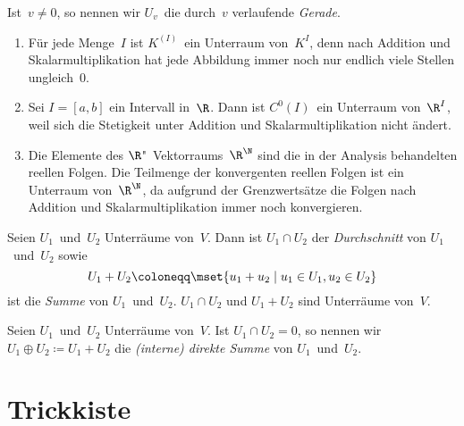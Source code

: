 \documentclass[a4paper]{article}
\begin{document}
\begin{notation}[Gerade]
    Ist~$v \neq 0$, so nennen wir $U_v$~die durch~$v$ verlaufende \emph{Gerade}.
\end{notation}

\begin{example}\leavevmode
    \begin{enumerate}
        \item Für jede Menge~$I$ ist $K^{(I)}$~ein Unterraum von~$K^I$, denn nach Addition und Skalarmultiplikation hat jede Abbildung immer noch nur endlich viele Stellen ungleich~0.
        \item Sei $I = [a,b]$ ein Intervall in~$\R$. Dann ist $C^0(I)$~ein Unterraum von~$\R^I$, weil sich die Stetigkeit unter Addition und Skalarmultiplikation nicht ändert.
        \item Die Elemente des $\R$"~Vektorraums~$\R^\N$ sind die in der Analysis behandelten reellen Folgen. Die Teilmenge der konvergenten reellen Folgen ist ein Unterraum von~$\R^\N$, da aufgrund der Grenzwertsätze die Folgen nach Addition und Skalarmultiplikation immer noch konvergieren.
    \end{enumerate}
\end{example}

\begin{definition}
    Seien $U_1$~und~$U_2$ Unterräume von~$V$. Dann ist $U_1 \cap U_2$ der \emph{Durchschnitt} von $U_1$~und~$U_2$ sowie
    \begin{equation*}
        U_1+U_2 \coloneqq \mset{u_1+u_2 \mid u_1 \in U_1, u_2 \in U_2}
    \end{equation*}
    ist die \emph{Summe} von $U_1$~und~$U_2$. $U_1 \cap U_2$ und $U_1+U_2$ sind Unterräume von~$V$.
\end{definition}

\begin{definition}
    Seien $U_1$~und~$U_2$ Unterräume von~$V$. Ist $U_1 \cap U_2 = 0$, so nennen wir $U_1 \oplus U_2 \coloneqq U_1+U_2$ die \emph{(interne) direkte Summe} von $U_1$~und~$U_2$.
\end{definition}



\newpage\appendix

\section{Trickkiste}
\end{document}
